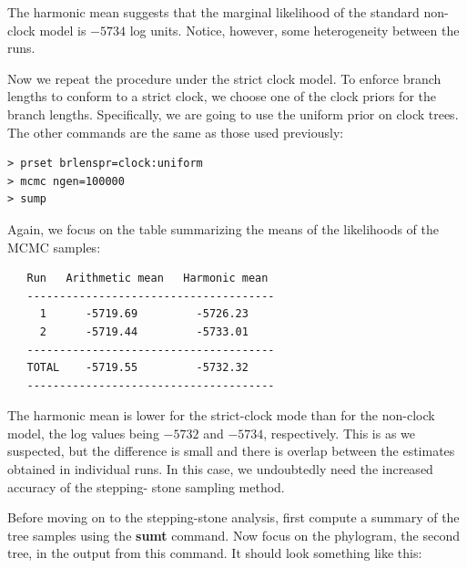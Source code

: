 \documentclass[12pt]{book}
\begin{document}
The harmonic mean suggests that the marginal likelihood of the standard non-clock model is $-5734$ log units. Notice,
however, some heterogeneity between the runs.

Now we repeat the procedure under the strict clock model. To enforce branch lengths to conform to a strict clock, we
choose one of the clock priors for the branch lengths. Specifically, we are going to use the uniform prior on clock trees.
The other commands are the same as those used previously:

\begin{singlespacing}
\begin{verbatim}
> prset brlenspr=clock:uniform
> mcmc ngen=100000
> sump
\end{verbatim}
\end{singlespacing}

Again, we focus on the table summarizing the means of the likelihoods of the MCMC samples:

\begin{singlespacing}
\begin{verbatim}
   Run   Arithmetic mean   Harmonic mean
   --------------------------------------
     1      -5719.69         -5726.23
     2      -5719.44         -5733.01
   --------------------------------------
   TOTAL    -5719.55         -5732.32
   --------------------------------------
\end{verbatim}
\end{singlespacing}

The harmonic mean is lower for the strict-clock mode than for the non-clock model, the log values being $-5732$
and $-5734$, respectively. This is as we suspected, but the difference is small and there is overlap between the
estimates obtained in individual runs. In this case, we undoubtedly need the increased accuracy of the stepping-
stone sampling method.

Before moving on to the stepping-stone analysis, first compute a summary of the tree samples using the
\textbf{sumt} command. Now focus on the phylogram, the second tree, in the output from this command. It
should look something like this:
\end{document}
